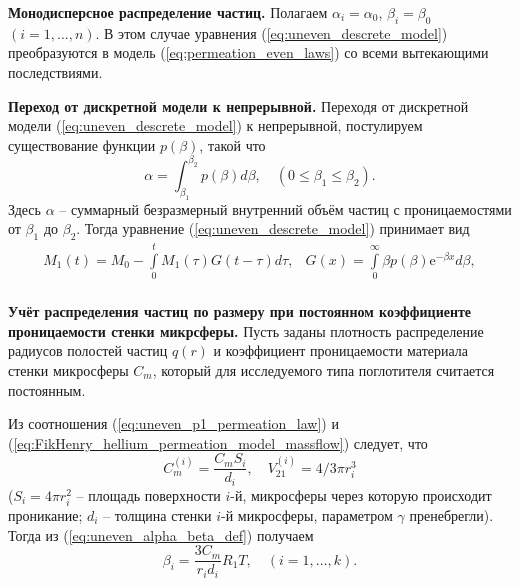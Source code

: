 \textbf{Монодисперсное распределение частиц.}
Полагаем $\alpha_i=\alpha_0$, $\beta_i=\beta_0$ $(i=1,...,n)$. В этом случае уравнения (\ref{eq:uneven_descrete_model}) преобразуются в модель (\ref{eq:permeation_even_laws}) со всеми вытекающими последствиями.

\textbf{Переход от дискретной модели к непрерывной.}
Переходя от дискретной модели (\ref{eq:uneven_descrete_model}) к непрерывной, постулируем существование функции $p(\beta)$, такой что 
\begin{equation}
\label{eq:uneven_pbeta_def}
\alpha = \int_{\beta_1}^{\beta_2} p(\beta) d\beta,\quad
(0 \leq \beta_1 \leq \beta_2).
\end{equation}
Здесь $\alpha$ -- суммарный безразмерный внутренний объём частиц с проницаемостями от $\beta_1$ до $\beta_2$. Тогда уравнение (\ref{eq:uneven_descrete_model}) принимает вид
\begin{equation}
\label{eq:uneven_cont_model}
\begin{array}{rl}
M_1(t)=M_0-\int\limits_{0}^{t}  M_1(\tau)  G(t-\tau) d\tau, & 
G(x) = \int\limits_{0}^{\infty}\beta p(\beta)  \mathrm{e}^{-\beta x} d\beta,\\
\end{array}
\end{equation}


\textbf{Учёт распределения частиц по размеру при постоянном коэффициенте проницаемости стенки микрсферы.}
Пусть заданы плотность распределение радиусов полостей частиц $q(r)$ и коэффициент проницаемости материала стенки микросферы $C_m$, который для исследуемого типа поглотителя считается постоянным.

Из соотношения (\ref{eq:uneven_p1_permeation_law}) и (\ref{eq:FikHenry_hellium_permeation_model_massflow}) следует, что
\begin{equation*}
\label{eq:uneven_Cmi_V21i_def}
C_m^{(i)} = \frac{C_m S_i}{d_i}, \quad V_{21}^{(i)} = 4/3\pi r_i^3
\end{equation*}
($S_i=4 \pi r_i^2$ -- площадь поверхности $i$-й, микросферы через которую происходит проникание; $d_i$ -- толщина стенки $i$-й микросферы, параметром $\gamma$ пренебрегли). Тогда из (\ref{eq:uneven_alpha_beta_def}) получаем
\begin{equation}
\label{eq:uneven_beta_reduction}
\beta_i = \frac{3 C_m}{r_i d_i} R_1 T, \quad (i=1,\ldots, k).
\end{equation}

